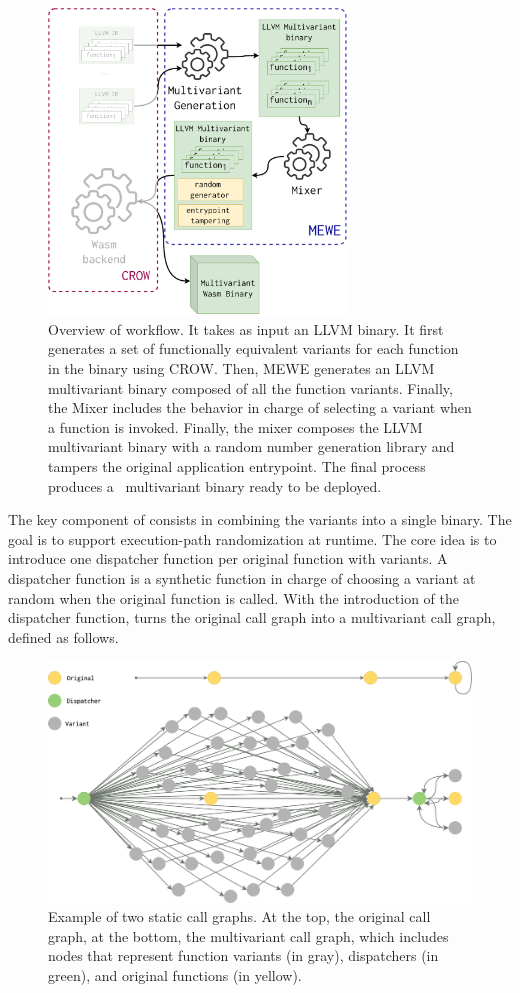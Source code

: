 \begin{figure}
  \centering
  \includegraphics[height=3.2in]{diagrams/MEWE.pdf}
  \caption{Overview of \tool workflow. It takes as input an LLVM binary. It first generates a set of functionally equivalent variants for each function in the binary using CROW. Then, MEWE generates an LLVM multivariant binary composed of all the function variants. Finally, the Mixer includes the behavior in charge of selecting a variant when a function is invoked. Finally, the \tool mixer composes the LLVM multivariant binary with a random number generation library and tampers the original application entrypoint. The final process produces a \wasm\ multivariant binary ready to be deployed. }
  \label{workflow}
\end{figure}




The key component of \tool consists in combining the variants into a single binary.
The goal is to support execution-path randomization at runtime.
The core idea is to introduce one dispatcher function per original function with variants.
A dispatcher function is a synthetic function in charge of choosing a variant at random when the original function is called.
With the introduction of the dispatcher function,  \tool turns the original call graph into a multivariant call graph, defined as follows. 


\begin{figure}
    \centering
  \includegraphics[width=.8\linewidth]{diagrams/CFG.png}
  \caption{Example of two static call graphs. At the top, the original call graph, at the bottom, the multivariant call graph, which includes nodes that represent function variants (in gray), dispatchers (in green), and original functions  (in yellow).
}
  \label{multivariant}
\end{figure}

